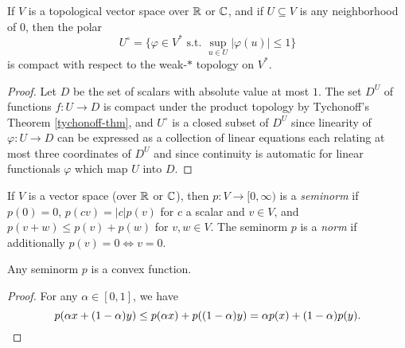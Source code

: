 \begin{thm}[Alaoglu]\label{thm-alaoglu} If $V$ is a topological vector space over $\mathbb{R}$ or $\mathbb{C}$, and if $U \subseteq V$ is any neighborhood of $0$, then the polar
\[
U^\circ = \{\varphi \in V^* \text{ s.t. } \sup_{u \in U} |\varphi(u)| \le 1\}
\]
is compact with respect to the weak-$*$ topology on $V^*$.
\end{thm}
\begin{proof} Let $D$ be the set of scalars with absolute value at most $1$. The set $D^U$ of functions $f : U \rightarrow D$ is compact under the product topology by Tychonoff's Theorem \ref{tychonoff-thm}, and $U^\circ$ is a closed subset of $D^U$ since linearity of $\varphi : U \rightarrow D$ can be expressed as a collection of linear equations each relating at most three coordinates of $D^U$ and since continuity is automatic for linear functionals $\varphi$ which map $U$ into $D$.
\end{proof}

\begin{defn} If $V$ is a vector space (over $\mathbb{R}$ or $\mathbb{C}$), then $p:V \rightarrow [0,\infty)$ is a \emph{seminorm} if $p(0) = 0$, $p(cv) = |c|p(v)$ for $c$ a scalar and $v\in V$, and $p(v+w) \le p(v) + p(w)$ for $v,w \in V$. The seminorm $p$ is a \emph{norm} if additionally $p(v) = 0 \iff v = 0$.
\end{defn}

\begin{prop} Any seminorm $p$ is a convex function.
\end{prop}
\begin{proof} For any $\alpha \in [0,1]$, we have
\[
p(\alpha x + (1-\alpha)y) \le p(\alpha x) + p((1-\alpha)y) = \alpha p(x) + (1-\alpha) p(y).\qedhere
\]
\end{proof}

